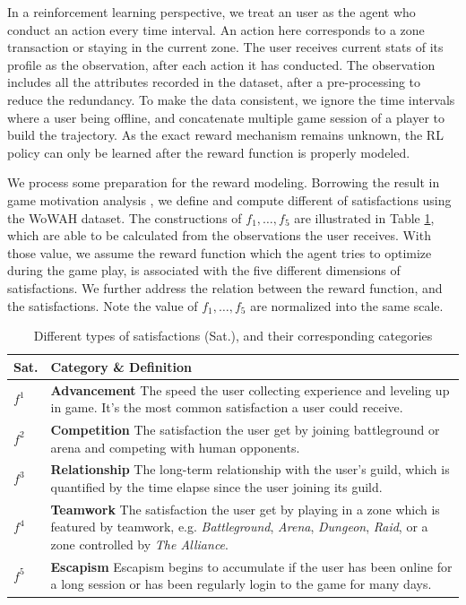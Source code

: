 \documentclass{sigchi}
\begin{document}
In a reinforcement learning perspective, we treat an user as the agent who conduct an action every time interval.
An action here corresponds to a zone transaction or staying in the current zone. 
The user receives current stats of its profile as the observation, after each action it has conducted.
The observation includes all the attributes recorded in the dataset, after a pre-processing to reduce the redundancy.
To make the data consistent, we ignore the time intervals where a user being offline, and concatenate multiple game session of a player to build the trajectory.
As the exact reward mechanism remains unknown, the RL policy can only be learned after the reward function is properly modeled.

We process some preparation for the reward modeling. 
Borrowing the result in game motivation analysis \cite{yee2006motivations}, we define and compute different of satisfactions using the WoWAH dataset.
The constructions of $f_1,\dots, f_5$ are illustrated in Table \ref{tbl:satisfactions}, which are able to be calculated from the observations the user receives.
With those value, we assume the reward function which the agent tries to optimize during the game play, is associated with the five different dimensions of satisfactions. 
We further address the relation between the reward function, and the satisfactions.
Note the value of $f_1,\dots, f_5$ are normalized into the same scale.

\begin{table}
\caption{Different types of satisfactions (Sat.), and their corresponding categories}
\begin{tabularx}{\textwidth}{lX}
    Sat. & \textbf{Category} \& Definition \\
    \midrule
    $f^1$ & \textbf{Advancement} The speed the user collecting experience and leveling up in game. It's the most common satisfaction a user could receive. \\
    $f^2$ & \textbf{Competition} The satisfaction the user get by joining battleground or arena and competing with human opponents. \\
    $f^3$ & \textbf{Relationship} The long-term relationship with the user's guild, which is quantified by the time elapse since the user joining its guild. \\
    $f^4$ & \textbf{Teamwork} The satisfaction the user get by playing in a zone which is featured by teamwork, e.g. \textit{Battleground}, \textit{Arena}, \textit{Dungeon}, \textit{Raid}, or a zone controlled by \textit{The Alliance}. \\
    $f^5$ & \textbf{Escapism} Escapism begins to accumulate if the user has been online for a long session or has been regularly login to the game for many days.
    \label{tbl:satisfactions}
\end{tabularx}
\end{table}
\end{document}
